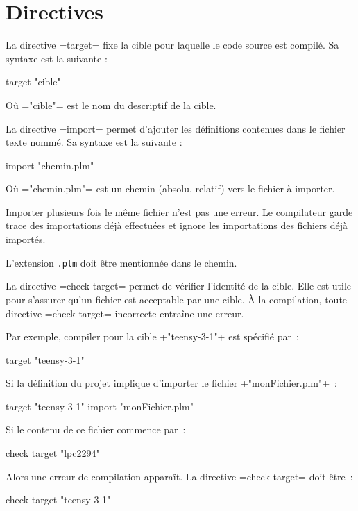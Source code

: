 




\chapter{Directives}



La directive \plm=target= fixe la cible pour laquelle le code source est compilé. Sa syntaxe est la suivante :
\begin{PLM}
target "cible"
\end{PLM} 
Où \plm="cible"= est le nom du descriptif de la cible.







La directive \plm=import= permet d'ajouter les définitions contenues dans le fichier texte nommé. Sa syntaxe est la suivante :
\begin{PLM}
import "chemin.plm"
\end{PLM} 
Où \plm="chemin.plm"= est un chemin (absolu, relatif) vers le fichier à importer.

Importer plusieurs fois le même fichier n'est pas une erreur. Le compilateur garde trace des importations déjà effectuées et ignore les importations des fichiers déjà importés.

L'extension \texttt{.plm} doit être mentionnée dans le chemin.



La directive \plm=check target= permet de vérifier l'identité de la cible. Elle est utile pour s'assurer qu'un fichier est acceptable par une cible. À la compilation, toute directive \plm=check target= incorrecte entraîne une erreur.

Par exemple, compiler pour la cible \plm+"teensy-3-1"+ est spécifié par~:

\begin{PLM}
target "teensy-3-1"
\end{PLM}

Si la définition du projet implique d'importer le fichier \plm+"monFichier.plm"+~:

\begin{PLM}
target "teensy-3-1"
import "monFichier.plm"
\end{PLM}

Si le contenu de ce fichier commence par~:
\begin{PLM}
check target "lpc2294"
\end{PLM}

Alors une erreur de compilation apparaît. La directive \plm=check target= doit être~:
\begin{PLM}
check target "teensy-3-1"
\end{PLM}

